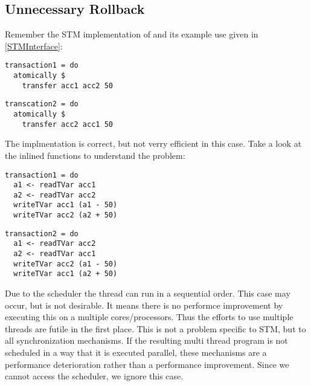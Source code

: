 \subsection{Unnecessary Rollback}
\label{Prob:UnRo}
Remember the STM implementation of  and its example use given in \ref{STMInterface}: 
\par\noindent
\begin{minipage}[t]{.45\textwidth}
\begin{lstlisting}[frame=lrtb]
transaction1 = do
  atomically $
    transfer acc1 acc2 50
\end{lstlisting}
\end{minipage}
\hfill
\begin{minipage}[t]{.45\textwidth}
\begin{lstlisting}[frame=lrtb]
transcation2 = do 
  atomically $ 
    transfer acc2 acc1 50
\end{lstlisting}
\end{minipage}
The implmentation is correct, but not verry efficient in this case. Take a look at the inlined functions to understand the 
problem:
\par\noindent
\begin{minipage}[t]{.45\textwidth}
\begin{lstlisting}[frame=lrtb]
transaction1 = do
  a1 <- readTVar acc1
  a2 <- readTVar acc2
  writeTVar acc1 (a1 - 50)
  writeTVar acc2 (a2 + 50)
\end{lstlisting}
\end{minipage}
\hfill
\begin{minipage}[t]{.45\textwidth}
\begin{lstlisting}[frame=lrtb]
transaction2 = do 
  a1 <- readTVar acc2
  a2 <- readTVar acc1
  writeTVar acc2 (a1 - 50)
  writeTVar acc1 (a2 + 50)
\end{lstlisting}
\end{minipage}

Due to the scheduler the thread can run in a sequential order. This case may occur, but is not desirable. It means 
there is no performce improvement by executing this on a multiple cores/processors. Thus the efforts to use multiple
threads are futile in the first place. This is not a problem specific to STM, but to all synchronization mechanisms. 
If the resulting multi thread program is not scheduled in a way that it is executed parallel, these mechanisms are a
performance deterioration rather than a performance improvement. Since we cannot access the scheduler, we ignore 
this case. 

